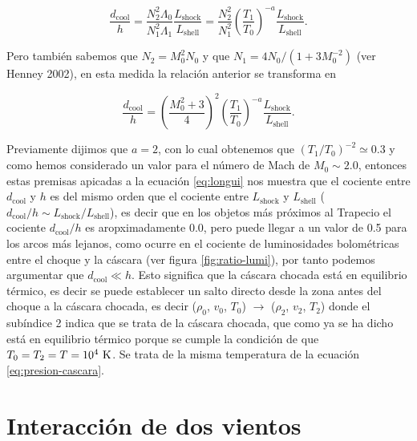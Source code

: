\begin{equation*}
 \frac{d_{\text{cool}}}{h} = \frac{N^{2}_{2}\Lambda_{0}}{N^{2}_{1}\Lambda_{1}} \frac{L_{\text{shock}}}{L_{\text{shell}}} = \frac{N^{2}_{2}}{N^{2}_{1}}\left(\frac{T_{1}}{T_{0}}\right)^{-a} \frac{L_{\text{shock}}}{L_{\text{shell}}}.
\end{equation*}

Pero también sabemos que \(N_{2}=M^{2}_{0}N_{0}\) y que \(N_{1} = 4N_{0}/(1+3M_{0}^{-2})\) (ver Henney 2002), en esta medida la relación anterior se transforma en  

\begin{equation}
\label{eq:longui}
 \frac{d_{\text{cool}}}{h} = \left(\frac{M^{2}_{0}+3}{4}\right)^{2} \left(\frac{T_{1}}{T_{0}}\right)^{-a} \frac{L_{\text{shock}}}{L_{\text{shell}}}.
\end{equation}

Previamente dijimos que \(a = 2\), con lo cual obtenemos que \((T_{1}/T_{0})^{-2} \simeq 0.3\) y como hemos considerado un valor para el número de Mach de \(M_{0}\sim 2.0\), entonces estas premisas apicadas a la ecuación \ref{eq:longui} nos muestra que el cociente entre \(d_{\text{cool}}\) y \(h\) es del mismo orden que el cociente entre \(L_{\text{shock}}\) y \(L_{\text{shell}}\) (\(d_{\text{cool}}/h \sim L_{\text{shock}}/L_{\text{shell}}\)), es decir que en los objetos más próximos al Trapecio el cociente \(d_{\text{cool}} / h\) es aropximadamente 0.0, pero  puede llegar a un valor de 0.5 para los arcos más lejanos, como ocurre en el cociente de luminosidades bolométricas entre el choque y la cáscara (ver figura \ref{fig:ratio-lumi}), por tanto podemos argumentar que \(d_{\text{cool}} \ll h\). Esto significa que la cáscara chocada está en equilibrio térmico, es decir se puede establecer un salto directo desde la zona antes del choque a la cáscara chocada, es decir (\(\rho_{0}\), \(v_{0}\), \(T_{0}\)) \(\rightarrow\) (\(\rho_{2}\), \(v_{2}\), \(T_{2}\)) donde el subíndice 2 indica que se trata de la cáscara chocada, que como ya se ha dicho está en equilibrio térmico porque se cumple la condición de que \(T_{0} = T_{2} = T = 10^{4}~\mathrm{K}\). Se trata de la misma temperatura de la ecuación \ref{eq:presion-cascara}. \\  

\section{Interacción de dos vientos}
\label{sec:interaction}

